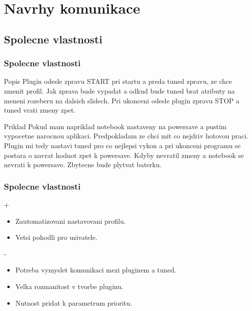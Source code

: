 \documentclass[pdf]{beamer}
\begin{document}
\section{Navrhy komunikace}
\subsection{Spolecne vlastnosti}
\begin{frame} %
	\frametitle{Spolecne vlastnosti}
	\begin{block}{Popis}
		Plugin odesle zpravu START pri startu a preda tuned zpravu, ze chce zmenit profil. 
		Jak zprava bude vypadat a odkud bude tuned brat atributy na meneni rozeberu na dalsich slidech.
		Pri ukonceni odesle plugin zpravu STOP a tuned vrati zmeny zpet.
	\end{block}
	\begin{block}{Priklad}
		Pokud mam napriklad notebook nastaveny na powersave a pustim vypocetne narocnou aplikaci. Predpokladam ze chci mit co nejdriv hotovou praci. Plugin mi tedy nastavi tuned pro co nejlepsi vykon a pri ukonceni programu se postara o navrat hodnot zpet k powersave. Kdyby nevratil zmeny a notebook se nevrati k powersave. Zbytecne bude plytvat baterku.
	\end{block}
\end{frame}
\begin{frame}
	\frametitle{Spolecne vlastnosti}
	\begin{block}{+}
		\begin{itemize}
			\item Zautomatizovani nastavovani profilu.
			\item Vetsi pohodli pro uzivatele.
		\end{itemize}
	\end{block}
	\begin{block}{-}
		\begin{itemize}
			\item Potreba vymyslet komunikaci mezi pluginem a tuned.
			\item Velka rozmanitost v tvorbe pluginu.
			\item Nutnost pridat k parametrum prioritu.
		\end{itemize}
	\end{block}
\end{frame} %
\end{document}
